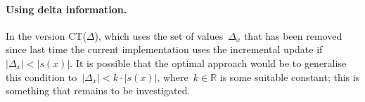 \documentclass[a4paper,11pt]{article}
\numberwithin{equation}{section}
\begin{document}
\paragraph{Using delta information.} In the version CT($\Delta$), which uses
the set of values~$\Delta_x$ that has been removed since last time the current
implementation uses the incremental update if~$|\Delta_x| < |s(x)|$. 
It is possible that the optimal approach would be to generalise this condition
to~$|\Delta_x| < k \cdot |s(x)|$, where~$k \in \mathbb{R}$ is some suitable constant;
this is something that remains to be investigated.




\end{document}
